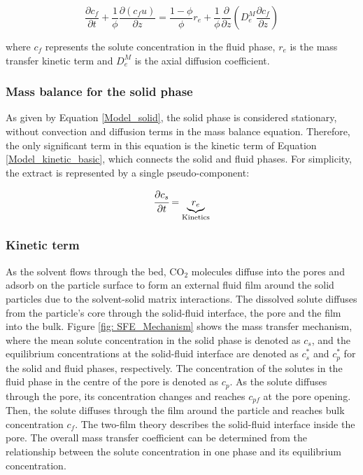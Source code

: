 \documentclass[a4paper,fleqn]{cas-dc}
\begin{document}
{\footnotesize
	\begin{equation}
		\label{Model_fluid}
		\frac{\partial c_f}{\partial t}
		+ \frac{1}{\phi} \frac{\partial \left( c_f u\right)}{\partial z}
		= \frac{1-\phi}{\phi} r_e
		+ \frac{1}{\phi} \frac{\partial}{\partial z} \left( D^M_e \frac{\partial c_f}{\partial z} \right)
	\end{equation}
}

where $c_f$ represents the solute concentration in the fluid phase, $r_e$ is the mass transfer kinetic term and $D^M_e$ is the axial diffusion coefficient.

\subsubsection{Mass balance for the solid phase} \label{Mass_balance_solid}

As given by Equation \ref{Model_solid}, the solid phase is considered stationary, without convection and diffusion terms in the mass balance equation. Therefore, the only significant term in this equation is the kinetic term of Equation \ref{Model_kinetic_basic}, which connects the solid and fluid phases. For simplicity, the extract is represented by a single pseudo-component: 

{\footnotesize
	\begin{equation} 
		\label{Model_solid}
				\cfrac{\partial c_s}{\partial t} = \underbrace{ r_e }_{\text{Kinetics}}
		\end{equation} }
		
		\subsubsection{Kinetic term} \label{CH: Kinetic}
		
		As the solvent flows through the bed, CO$_2$ molecules diffuse into the pores and adsorb on the particle surface to form an external fluid film around the solid particles due to the solvent-solid matrix interactions. The dissolved solute diffuses from the particle's core through the solid-fluid interface, the pore and the film into the bulk. Figure \ref{fig: SFE_Mechanism} shows the mass transfer mechanism, where the mean solute concentration in the solid phase is denoted as $c_s$, and the equilibrium concentrations at the solid-fluid interface are denoted as $c_s^*$ and $c_p^*$ for the solid and fluid phases, respectively. The concentration of the solutes in the fluid phase in the centre of the pore is denoted as $c_p$. As the solute diffuses through the pore, its concentration changes and reaches $c_{pf}$ at the pore opening. Then, the solute diffuses through the film around the particle and reaches bulk concentration $c_f$. The two-film theory describes the solid-fluid interface inside the pore. The overall mass transfer coefficient can be determined from the relationship between the solute concentration in one phase and its equilibrium concentration.
		
\end{document}
